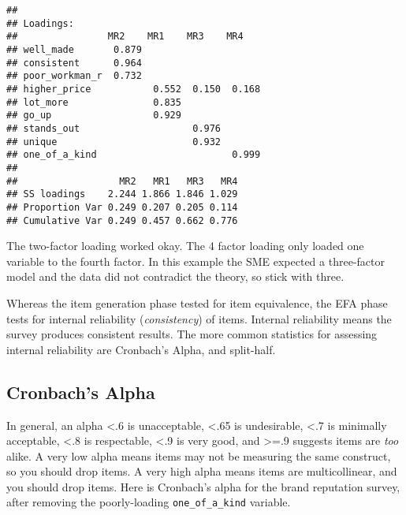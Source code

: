 \documentclass[
]{book}
\newenvironment{Shaded}{\begin{snugshade}}{\end{snugshade}}
\newcommand{\DecValTok}[1]{\textcolor[rgb]{0.00,0.00,0.81}{#1}}
\newcommand{\FunctionTok}[1]{\textcolor[rgb]{0.00,0.00,0.00}{#1}}
\newcommand{\NormalTok}[1]{#1}
\newcommand{\SpecialCharTok}[1]{\textcolor[rgb]{0.00,0.00,0.00}{#1}}
\theoremstyle{definition}
\theoremstyle{definition}
\theoremstyle{definition}
\theoremstyle{definition}
\theoremstyle{remark}
\begin{document}
\begin{verbatim}
## 
## Loadings:
##                MR2    MR1    MR3    MR4   
## well_made       0.879                     
## consistent      0.964                     
## poor_workman_r  0.732                     
## higher_price           0.552  0.150  0.168
## lot_more               0.835              
## go_up                  0.929              
## stands_out                    0.976       
## unique                        0.932       
## one_of_a_kind                        0.999
## 
##                  MR2   MR1   MR3   MR4
## SS loadings    2.244 1.866 1.846 1.029
## Proportion Var 0.249 0.207 0.205 0.114
## Cumulative Var 0.249 0.457 0.662 0.776
\end{verbatim}

The two-factor loading worked okay. The 4 factor loading only loaded one variable to the fourth factor. In this example the SME expected a three-factor model and the data did not contradict the theory, so stick with three.

Whereas the item generation phase tested for item equivalence, the EFA phase tests for internal reliability (\emph{consistency}) of items. Internal reliability means the survey produces consistent results. The more common statistics for assessing internal reliability are Cronbach's Alpha, and split-half.

\hypertarget{cronbachs-alpha}{%
\subsection{Cronbach's Alpha}\label{cronbachs-alpha}}

In general, an alpha \textless.6 is unacceptable, \textless.65 is undesirable, \textless.7 is minimally acceptable, \textless.8 is respectable, \textless.9 is very good, and \textgreater=.9 suggests items are \emph{too} alike. A very low alpha means items may not be measuring the same construct, so you should drop items. A very high alpha means items are multicollinear, and you should drop items. Here is Cronbach's alpha for the brand reputation survey, after removing the poorly-loading \texttt{one\_of\_a\_kind} variable.

\begin{Shaded}
\end{Shaded}
\end{document}
